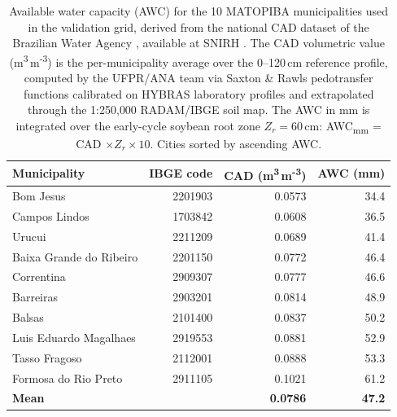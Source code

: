 \begin{table}[t]
\centering
\caption{Available water capacity (AWC) for the 10 MATOPIBA municipalities used in the validation grid, derived from the national CAD dataset of the Brazilian Water Agency \citep{SantosANAUFPR_TED}, available at SNIRH \citep{SNIRH28fe4baa}. The CAD volumetric value (m\textsuperscript{3}\,m\textsuperscript{-3}) is the per-municipality average over the 0--120\,cm reference profile, computed by the UFPR/ANA team via Saxton \& Rawls \citep{SaxtonRawls2006} pedotransfer functions calibrated on HYBRAS \citep{Ottoni2018HYBRAS} laboratory profiles and extrapolated through the 1:250{,}000 RADAM/IBGE soil map. The AWC in mm is integrated over the early-cycle soybean root zone \(Z_r=60\)\,cm: AWC\textsubscript{mm} = CAD \(\times Z_r \times 10\). Cities sorted by ascending AWC.}
\label{tab:soils-matopiba}
\begin{tabular}{lrrr}
\toprule
Municipality & IBGE code & CAD (m\textsuperscript{3}\,m\textsuperscript{-3}) & AWC (mm) \\
\midrule
Bom Jesus & 2201903 & 0.0573 & 34.4 \\
Campos Lindos & 1703842 & 0.0608 & 36.5 \\
Urucui & 2211209 & 0.0689 & 41.4 \\
Baixa Grande do Ribeiro & 2201150 & 0.0772 & 46.4 \\
Correntina & 2909307 & 0.0777 & 46.6 \\
Barreiras & 2903201 & 0.0814 & 48.9 \\
Balsas & 2101400 & 0.0837 & 50.2 \\
Luis Eduardo Magalhaes & 2919553 & 0.0881 & 52.9 \\
Tasso Fragoso & 2112001 & 0.0888 & 53.3 \\
Formosa do Rio Preto & 2911105 & 0.1021 & 61.2 \\
\midrule
\textbf{Mean} & & \textbf{0.0786} & \textbf{47.2} \\
\bottomrule
\end{tabular}
\end{table}